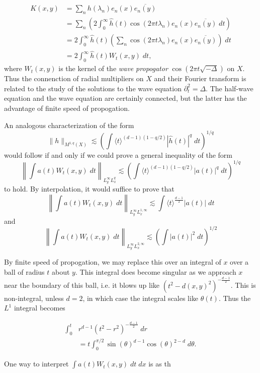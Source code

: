 %
\begin{align*}
    K(x,y) &= \sum_n h(\lambda_n) e_n(x) \overline{e_n(y)}\\
    &= \sum_n \left( 2 \int_0^\infty \widehat{h}(t) \cos(2 \pi t \lambda_n) e_n(x) \overline{e_n(y)}\; dt \right)\\
    &= 2 \int_0^\infty \widehat{h}(t) \left( \sum_n \cos(2 \pi t \lambda_n) e_n(x) \overline{e_n(y)} \right)\; dt\\
    &= 2 \int_0^\infty \widehat{h}(t) W_t(x,y)\; dt,
\end{align*}
%
where $W_t(x,y)$ is the kernel of the \emph{wave propogator} $\cos(2 \pi t \sqrt{-\Delta})$ on $X$. Thus the connenction of radial multipliers on $X$ and their Fourier transform is related to the study of the solutions to the wave equation $\partial_t^2 = \Delta$. The half-wave equation and the wave equation are certainly connected, but the latter has the advantage of finite speed of propogation.

An analogous characterization of the form
%
\[ \| h \|_{M^{1,q}(X)} \lesssim \left( \int \langle t \rangle^{(d-1)(1 - q/2)} |\widehat{h}(t)|^q\; dt \right)^{1/q} \]
%
would follow if and only if we could prove a general inequality of the form
%
\[ \left\| \int a(t) W_t(x,y)\; dt \right\|_{L^\infty_y L^q_x} \lesssim \left( \int \langle t \rangle^{(d-1)(1 - q/2)} |a(t)|^q\; dt \right)^{1/q} \]
%
to hold. By interpolation, it would suffice to prove that
%
\[ \left\| \int a(t) W_t(x,y)\; dt \right\|_{L^\infty_y L^{1,\infty}_x} \lesssim \int \langle t \rangle^{\frac{d-1}{2}} |a(t)|\; dt \]
%
and
%
\[ \left\| \int a(t) W_t(x,y)\; dt \right\|_{L^\infty_y L^{2,\infty}_x} \lesssim \left( \int |a(t)|^2\; dt \right)^{1/2} \]


By finite speed of propogation, we may replace this over an integral of $x$ over a ball of radius $t$ about $y$. This integral does become singular as we approach $x$ near the boundary of this ball, i.e. it blows up like $(t^2 - d(x,y)^2)^{- \frac{d-1}{2}}$. This is non-integral, unless $d = 2$, in which case the integral scales like $\theta(t)$. Thus the $L^1$ integral becomes

\begin{align*}
    \int_0^t & r^{d-1} (t^2 - r^2)^{- \frac{d-1}{2}}\; dr\\
    &= t \int_0^{\pi/2} \sin(\theta)^{d-1} \cos(\theta)^{2-d}\; d\theta.
\end{align*}

One way to interpret $\int a(t) W_t(x,y)\; dt\; dx$ is as th



